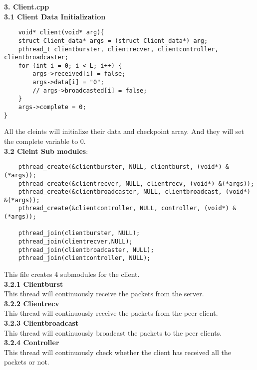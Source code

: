 \documentclass[12pt]{scrartcl}
\begin{document}
\textbf{3. Client.cpp}\\
\textbf{3.1 Client Data Initialization}
\begin{verbatim}
    void* client(void* arg){
    struct Client_data* args = (struct Client_data*) arg;
    pthread_t clientburster, clientrecver, clientcontroller, clientbroadcaster;
    for (int i = 0; i < L; i++) {
        args->received[i] = false;
        args->data[i] = "0";
        // args->broadcasted[i] = false;
    }
    args->complete = 0;
}
\end{verbatim}
All the cleints will initialize their data and checkpoint array. And they will set the complete variable to 0.\\
\textbf{3.2 Cleint Sub modules}:\\
\begin{verbatim}
    pthread_create(&clientburster, NULL, clientburst, (void*) &(*args));
    pthread_create(&clientrecver, NULL, clientrecv, (void*) &(*args));
    pthread_create(&clientbroadcaster, NULL, clientbroadcast, (void*) &(*args));
    pthread_create(&clientcontroller, NULL, controller, (void*) &(*args));

    pthread_join(clientburster, NULL);
    pthread_join(clientrecver,NULL);
    pthread_join(clientbroadcaster, NULL);
    pthread_join(clientcontroller, NULL);
\end{verbatim}
This file creates 4 submodules for the client.\\
\textbf{3.2.1 Clientburst}\\
This thread will continuously receive the packets from the server.\\
\textbf{3.2.2 Clientrecv}\\
This thread will continuously receive the packets from the peer client.\\
\textbf{3.2.3 Clientbroadcast}\\
This thread will continuously broadcast the packets to the peer clients.\\
\textbf{3.2.4 Controller}\\
This thread will continuously check whether the client has received all the packets or not.\\
\end{document}

